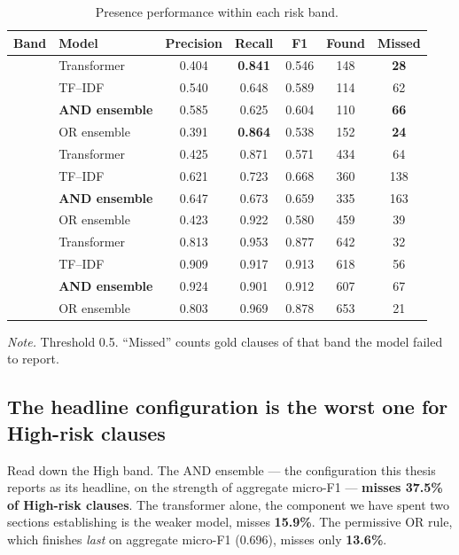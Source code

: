 \begin{table}[ht]
\centering
\caption{Presence performance within each risk band.}
\label{tab:riskeval}
\small
\begin{tabular}{llccccc}
\toprule
\textbf{Band} & \textbf{Model} & \textbf{Precision} & \textbf{Recall} & \textbf{F1} & \textbf{Found} & \textbf{Missed}\\
\midrule
{}
 & Transformer  & 0.404 & \textbf{0.841} & 0.546 & 148 & \textbf{28}\\
 & TF--IDF      & 0.540 & 0.648 & 0.589 & 114 & 62\\
 & \textbf{AND ensemble} & 0.585 & 0.625 & 0.604 & 110 & \textbf{66}\\
 & OR ensemble  & 0.391 & \textbf{0.864} & 0.538 & 152 & \textbf{24}\\
\addlinespace
{}
 & Transformer  & 0.425 & 0.871 & 0.571 & 434 & 64\\
 & TF--IDF      & 0.621 & 0.723 & 0.668 & 360 & 138\\
 & \textbf{AND ensemble} & 0.647 & 0.673 & 0.659 & 335 & 163\\
 & OR ensemble  & 0.423 & 0.922 & 0.580 & 459 & 39\\
\addlinespace
{}
 & Transformer  & 0.813 & 0.953 & 0.877 & 642 & 32\\
 & TF--IDF      & 0.909 & 0.917 & 0.913 & 618 & 56\\
 & \textbf{AND ensemble} & 0.924 & 0.901 & 0.912 & 607 & 67\\
 & OR ensemble  & 0.803 & 0.969 & 0.878 & 653 & 21\\
\bottomrule
\end{tabular}

{\footnotesize\singlespacing \emph{Note.} Threshold 0.5. ``Missed'' counts gold clauses of that band the model failed to report.\par}
\end{table}

\subsection{The headline configuration is the worst one for High-risk clauses}
Read down the High band. The AND ensemble --- the configuration this thesis reports as its headline, on the strength of aggregate micro-F1 --- \textbf{misses 37.5\% of High-risk clauses}. The transformer alone, the component we have spent two sections establishing is the weaker model, misses \textbf{15.9\%}. The permissive OR rule, which finishes \emph{last} on aggregate micro-F1 (0.696), misses only \textbf{13.6\%}.

